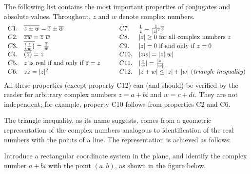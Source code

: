 \documentclass{ximera}
\begin{document}
The following list contains the most important properties of conjugates and absolute values. Throughout, $z$ and $w$ denote complex numbers.
\begin{equation*}
\begin{array}{llcll}
C1. & \overline{z \pm w} = \overline{z} \pm \overline{w} & \quad & C7. & \frac{1}{z} = \frac{1}{|z|^2}\overline{z} \\
C2. & \overline{zw} = \overline{z}~\overline{w} & \quad & C8. & |z| \geq 0 \mbox{ for all complex numbers } z \\
C3. & \overline{\left(\frac{z}{w}\right)} = \frac{\overline{z}}{\hspace{0.05em}\overline{w}\hspace{0.05em}} & \quad & C9. & |z| = 0 \mbox{ if and only if } z=0 \\
C4. & \overline{(\overline{z})} = z & \quad & C10. & |zw| = |z||w| \\
C5. & z \mbox{ is real if and only if } \overline{z} =z  & \quad & C11. & |\frac{z}{w}| = \frac{|z|}{|w|} \\
C6. & z\overline{z} = |z|^2 & \quad & C12. & |z+w| \leq |z|+|w| \mbox{ (\textit{triangle inequality})} \\
\end{array}
\end{equation*}
All these properties (except property C12) can (and should) be verified by the reader for arbitrary complex numbers $z = a + bi$ and $w = c + di$. They are not independent; for example, property C10 follows from properties C2 and C6.

The triangle inequality, as its name
suggests, comes from a geometric representation of the complex numbers
analogous to identification of the real numbers with the points of a
line. The representation is achieved as follows:



Introduce a rectangular coordinate system in the plane, and identify the complex number $a + bi$ with the point $(a, b)$, as shown in the figure below.
\begin{center}
\end{center}
\end{document}
